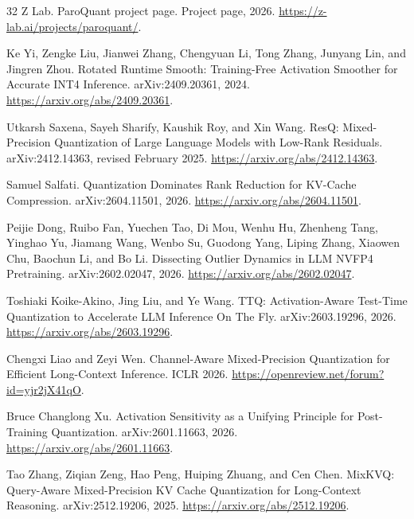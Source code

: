 \documentclass{article}
\begin{document}
\begin{thebibliography}{32}
Z Lab.
\newblock ParoQuant project page.
\newblock Project page, 2026.
\newblock \url{https://z-lab.ai/projects/paroquant/}.

Ke Yi, Zengke Liu, Jianwei Zhang, Chengyuan Li, Tong Zhang, Junyang Lin, and
Jingren Zhou.
\newblock Rotated Runtime Smooth: Training-Free Activation Smoother for
Accurate INT4 Inference.
\newblock arXiv:2409.20361, 2024.
\newblock \url{https://arxiv.org/abs/2409.20361}.

Utkarsh Saxena, Sayeh Sharify, Kaushik Roy, and Xin Wang.
\newblock ResQ: Mixed-Precision Quantization of Large Language Models with
Low-Rank Residuals.
\newblock arXiv:2412.14363, revised February 2025.
\newblock \url{https://arxiv.org/abs/2412.14363}.

Samuel Salfati.
\newblock Quantization Dominates Rank Reduction for KV-Cache Compression.
\newblock arXiv:2604.11501, 2026.
\newblock \url{https://arxiv.org/abs/2604.11501}.

Peijie Dong, Ruibo Fan, Yuechen Tao, Di Mou, Wenhu Hu, Zhenheng Tang,
Yinghao Yu, Jiamang Wang, Wenbo Su, Guodong Yang, Liping Zhang, Xiaowen Chu,
Baochun Li, and Bo Li.
\newblock Dissecting Outlier Dynamics in LLM NVFP4 Pretraining.
\newblock arXiv:2602.02047, 2026.
\newblock \url{https://arxiv.org/abs/2602.02047}.

Toshiaki Koike-Akino, Jing Liu, and Ye Wang.
\newblock TTQ: Activation-Aware Test-Time Quantization to Accelerate LLM
Inference On The Fly.
\newblock arXiv:2603.19296, 2026.
\newblock \url{https://arxiv.org/abs/2603.19296}.

Chengxi Liao and Zeyi Wen.
\newblock Channel-Aware Mixed-Precision Quantization for Efficient
Long-Context Inference.
\newblock ICLR 2026.
\newblock \url{https://openreview.net/forum?id=yjr2jX41qO}.

Bruce Changlong Xu.
\newblock Activation Sensitivity as a Unifying Principle for Post-Training
Quantization.
\newblock arXiv:2601.11663, 2026.
\newblock \url{https://arxiv.org/abs/2601.11663}.

Tao Zhang, Ziqian Zeng, Hao Peng, Huiping Zhuang, and Cen Chen.
\newblock MixKVQ: Query-Aware Mixed-Precision KV Cache Quantization for
Long-Context Reasoning.
\newblock arXiv:2512.19206, 2025.
\newblock \url{https://arxiv.org/abs/2512.19206}.

\end{thebibliography}
\end{document}
